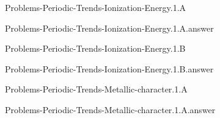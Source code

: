 \documentclass[main.tex]{subfiles}
\newcommand\chapterlabel{}
\begin{document}
\renewcommand\chapterlabel{Ch-radiation}
\begin{question}[ID=\the\value{numA}]
{Problems-Periodic-Trends-Ionization-Energy.1.A}
\end{question}
   \begin{Form}
   \TextField[multiline,backgroundcolor=gray!20,borderwidth=0,width=0.43\textwidth  ,height=115pt, name=\the\value{numA}]  { }\end{Form}
\begin{solution}
{Problems-Periodic-Trends-Ionization-Energy.1.A.answer}
\hspace{0.1cm}
\end{solution}


\renewcommand\chapterlabel{Ch-radiation}
\begin{question}[ID=\the\value{numA}]
{Problems-Periodic-Trends-Ionization-Energy.1.B}
\end{question}
   \begin{Form}
   \TextField[multiline,backgroundcolor=gray!20,borderwidth=0,width=0.43\textwidth  ,height=115pt, name=\the\value{numA}]  { }\end{Form}
\begin{solution}
{Problems-Periodic-Trends-Ionization-Energy.1.B.answer}
\hspace{0.1cm}
\end{solution}


\renewcommand\chapterlabel{Ch-radiation}
\begin{question}[ID=\the\value{numA}]
{Problems-Periodic-Trends-Metallic-character.1.A}
\end{question}
   \begin{Form}
   \TextField[multiline,backgroundcolor=gray!20,borderwidth=0,width=0.43\textwidth  ,height=115pt, name=\the\value{numA}]  { }\end{Form}
\begin{solution}
{Problems-Periodic-Trends-Metallic-character.1.A.answer}
\hspace{0.1cm}
\end{solution}
\end{document}
